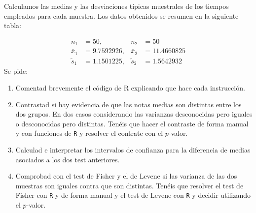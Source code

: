 \documentclass[
]{article}
\newenvironment{Shaded}{\begin{snugshade}}{\end{snugshade}}
\newcommand{\DataTypeTok}[1]{\textcolor[rgb]{0.13,0.29,0.53}{#1}}
\newcommand{\KeywordTok}[1]{\textcolor[rgb]{0.13,0.29,0.53}{\textbf{#1}}}
\newcommand{\NormalTok}[1]{#1}
\newcommand{\OperatorTok}[1]{\textcolor[rgb]{0.81,0.36,0.00}{\textbf{#1}}}
\newcommand{\OtherTok}[1]{\textcolor[rgb]{0.56,0.35,0.01}{#1}}
\newcommand{\StringTok}[1]{\textcolor[rgb]{0.31,0.60,0.02}{#1}}
\providecommand{\tightlist}{%
  \setlength{\itemsep}{0pt}\setlength{\parskip}{0pt}}
\begin{document}
\begin{Shaded}
\end{Shaded}

Calculamos las medias y las desviaciones típicas muestrales de los
tiempos empleados para cada muestra. Los datos obtenidos se resumen en
la siguiente tabla:

\[
\begin{array}{llll}
n_1&=50, & n_2&=50\\
\overline{x}_1&=9.7592926, & \overline{x}_2&=11.4660825\\
\tilde{s}_1&=1.1501225, & \tilde{s}_2&=1.5642932
\end{array}
\] Se pide:

\begin{enumerate}
\def\labelenumi{\arabic{enumi}.}
\tightlist
\item
  Comentad brevemente el código de R explicando que hace cada
  instrucción.
\item
  Contrastad si hay evidencia de que las notas medias son distintas
  entre los dos grupos. En dos casos considerando las varianzas
  desconocidas pero iguales o desconocidas pero distintas. Tenéis que
  hacer el contraste de forma manual y con funciones de \texttt{R} y
  resolver el contrate con el \(p\)-valor.
\item
  Calculad e interpretar los intervalos de confianza para la diferencia
  de medias asociados a los dos test anteriores.
\item
  Comprobad con el test de Fisher y el de Levene si las varianza de las
  dos muestras son iguales contra que son distintas. Tenéis que resolver
  el test de Fisher con \texttt{R} y de forma manual y el test de Levene
  con \texttt{R} y decidir utilizando el \(p\)-valor.
\end{enumerate}
\end{document}
